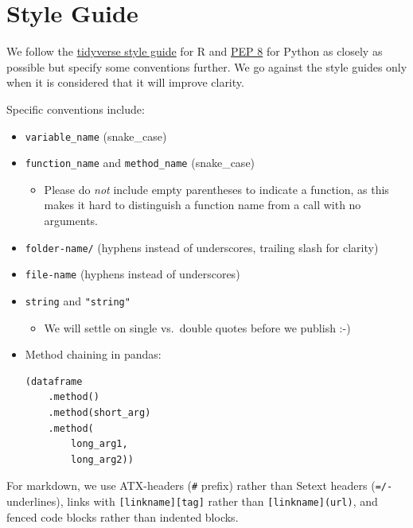 \documentclass[]{Nemilov}
\providecommand{\tightlist}{%
  \setlength{\itemsep}{0pt}\setlength{\parskip}{0pt}}
\begin{document}
\hypertarget{contributing-style}{%
\section{Style Guide}\label{contributing-style}}

We follow the \href{https://style.tidyverse.org/}{tidyverse style guide} for R and
\href{https://www.python.org/dev/peps/pep-0008/}{PEP 8} for Python as closely as
possible but specify some conventions further. We go against the style guides
only when it is considered that it will improve clarity.

Specific conventions include:

\begin{itemize}
\item
  \texttt{variable\_name} (snake\_case)
\item
  \texttt{function\_name} and \texttt{method\_name} (snake\_case)

  \begin{itemize}
  \tightlist
  \item
    Please do \emph{not} include empty parentheses to indicate a function,
    as this makes it hard to distinguish a function name from a call with no arguments.
  \end{itemize}
\item
  \texttt{folder-name/} (hyphens instead of underscores, trailing slash for clarity)
\item
  \texttt{file-name} (hyphens instead of underscores)
\item
  \texttt{\textquotesingle{}string\textquotesingle{}} and \texttt{"string"}

  \begin{itemize}
  \tightlist
  \item
    We will settle on single vs.~double quotes before we publish :-)
  \end{itemize}
\item
  Method chaining in pandas:

\begin{verbatim}
(dataframe
    .method()
    .method(short_arg)
    .method(
        long_arg1,
        long_arg2))
\end{verbatim}
\end{itemize}

For markdown, we use ATX-headers (\texttt{\#} prefix) rather than Setext headers (\texttt{=/-}
underlines), links with \texttt{{[}linkname{]}{[}tag{]}} rather than \texttt{{[}linkname{]}(url)}, and
fenced code blocks rather than indented blocks.
\end{document}
